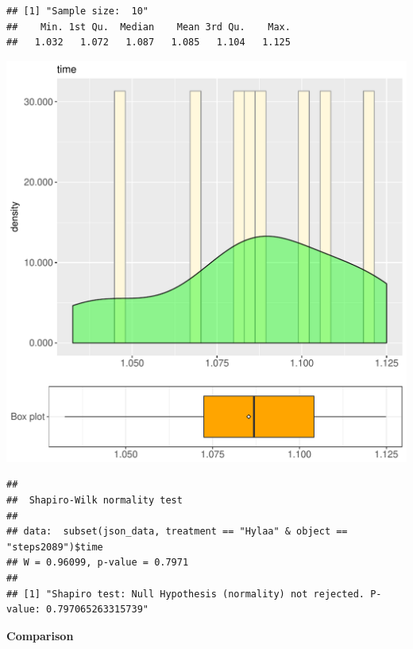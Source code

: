 \documentclass{article}\usepackage[]{graphicx}\usepackage[]{color}
\makeatletter
\def\maxwidth{ %
  \ifdim\Gin@nat@width>\linewidth
    \linewidth
  \else
    \Gin@nat@width
  \fi
}
\newenvironment{kframe}{%
 \def\at@end@of@kframe{}%
 \ifinner\ifhmode%
  \def\at@end@of@kframe{\end{minipage}}%
  \begin{minipage}{\columnwidth}%
 \fi\fi%
 \def\FrameCommand##1{\hskip\@totalleftmargin \hskip-\fboxsep
 \colorbox{shadecolor}{##1}\hskip-\fboxsep
     \hskip-\linewidth \hskip-\@totalleftmargin \hskip\columnwidth}%
 \MakeFramed {\advance\hsize-\width
   \@totalleftmargin\z@ \linewidth\hsize
   \@setminipage}}%
 {\par\unskip\endMakeFramed%
 \at@end@of@kframe}
\newenvironment{knitrout}{}{} %
\makeatother
\begin{document}
\begin{knitrout}
\color{fgcolor}\begin{kframe}
\begin{verbatim}
## [1] "Sample size:  10"
##    Min. 1st Qu.  Median    Mean 3rd Qu.    Max. 
##   1.032   1.072   1.087   1.085   1.104   1.125
\end{verbatim}
\end{kframe}
\includegraphics[width=\maxwidth]{figure/RH2_Hylaa_steps2089-1} 
\begin{kframe}\begin{verbatim}
## 
## 	Shapiro-Wilk normality test
## 
## data:  subset(json_data, treatment == "Hylaa" & object == "steps2089")$time
## W = 0.96099, p-value = 0.7971
## 
## [1] "Shapiro test: Null Hypothesis (normality) not rejected. P-value: 0.797065263315739"
\end{verbatim}
\end{kframe}
\end{knitrout}
  
 \textbf{Comparison}
  
\end{document}
